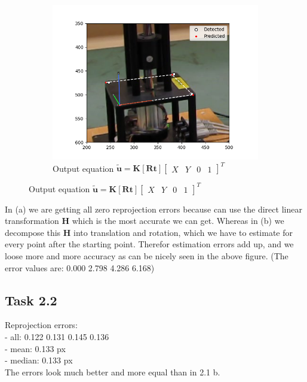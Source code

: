 \documentclass[a4paper]{article} %
\begin{document}
\begin{figure}[h]
\begin{subfigure}{0.45\textwidth}
        \end{subfigure}
        \hfill
        \begin{subfigure}{0.45\textwidth}
            \centering
            \includegraphics[width= \textwidth]{../python/out_part2_1b}
            \caption{Output equation $\bm{\tilde{u}} = \bm{K} \left[ \bm{R t} \right]
                \begin{bmatrix}
                    X & Y & 0 & 1
                \end{bmatrix}
            ^T$ }
        \end{subfigure}
        \hfill
    \end{figure}
    In (a) we are getting all zero reprojection errors because can use the direct linear transformation $\bm{H}$ which is the most accurate we can get.
    Whereas in (b) we decompose this $\bm{H}$ into translation and rotation, which we have to estimate for every point after the starting point.
    Therefor estimation errors add up, and we loose more and more accuracy as can be nicely seen in the above figure. (The error values are: 0.000 2.798 4.286 6.168)

    \subsection*{Task 2.2}
    Reprojection errors:\\
    - all: 0.122 0.131 0.145 0.136\\
    - mean: 0.133 px \\
    - median: 0.133 px\\
    The errors look much better and more equal than in 2.1 b.
    
\end{document}

